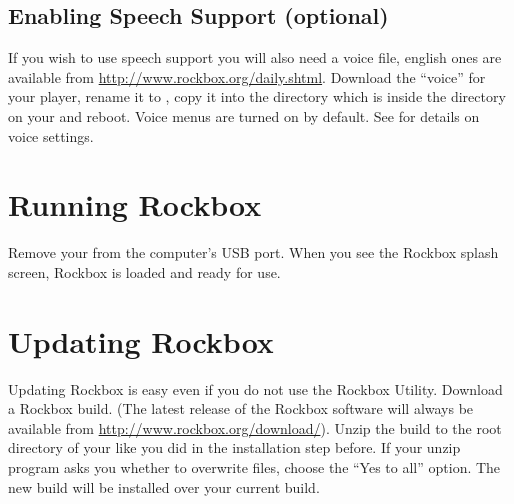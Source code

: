 \subsection{Enabling Speech Support (optional)}\label{sec:enabling_speech_support}
If you wish to use speech support you will also need a voice file, english ones
are available from \url{http://www.rockbox.org/daily.shtml}. Download the
``voice'' for your player, rename it to , copy it
into the  directory which is inside the  directory on
your \dap{} and reboot. Voice menus are turned on by default. See
 for details on voice settings.

\section{Running Rockbox}
Remove your \dap{} from the computer's USB port. %
%
%
When you see the Rockbox splash screen, Rockbox is loaded and ready for
use.


\section{Updating Rockbox}
Updating Rockbox is easy even if you do not use the Rockbox Utility.
Download a Rockbox build.
(The latest release of the Rockbox software will always be available from
\url{http://www.rockbox.org/download/}). Unzip the build to the root directory
of your \dap{} like you did in the installation step before. If your unzip
program asks you whether to overwrite files, choose the ``Yes to all'' option.
The new build will be installed over your current build.

